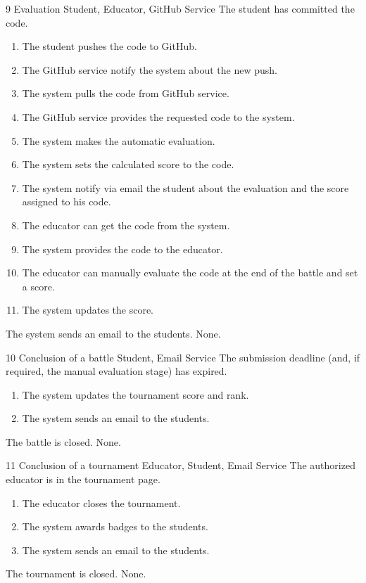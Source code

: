 \usecase
{9}
{Evaluation} %
{Student, Educator, GitHub Service} %
{The student has committed the code.} %
{ %
    \begin{enumerate}
        \item The student pushes the code to GitHub.
        \item The GitHub service notify the system about the new push.
        \item The system pulls the code from GitHub service.
        \item The GitHub service provides the requested code to the system.
        \item The system makes the automatic evaluation.
        \item The system sets the calculated score to the code.
        \item The system notify via email the student about the evaluation and the score assigned to his code.
        \item The educator can get the code from the system.
        \item The system provides the code to the educator.
        \item The educator can manually evaluate the code at the end of the battle and set a score.
        \item The system updates the score.
    \end{enumerate}
}
{The system sends an email to the students.} %
{ %
 None. 
}
{ %
}
\clearpage

\usecase
{10}
{Conclusion of a battle}
{Student, Email Service}
{The submission deadline (and, if required, the manual evaluation stage) has expired.}
{
    \begin{enumerate}
        \item The system updates the tournament score and rank.
        \item The system sends an email to the students.
    \end{enumerate}
}
{The battle is closed.}
{
    None.
}
{}


\usecase
{11}
{Conclusion of a tournament}
{Educator, Student, Email Service}
{The authorized educator is in the tournament page.}
{
    \begin{enumerate}
        \item The educator closes the tournament.
        \item The system awards badges to the students.
        \item The system sends an email to the students.
    \end{enumerate}
}
{The tournament is closed.}
{
    None.
}
{}

